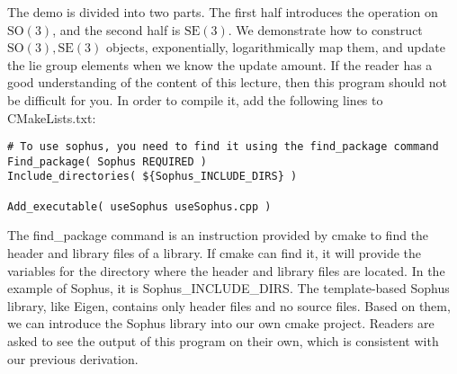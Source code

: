 The demo is divided into two parts. The first half introduces the operation on $\mathrm{SO}(3)$, and the second half is $\mathrm{SE}(3)$. We demonstrate how to construct $\mathrm{SO}(3), \mathrm{SE}(3)$ objects, exponentially, logarithmically map them, and update the lie group elements when we know the update amount. If the reader has a good understanding of the content of this lecture, then this program should not be difficult for you. In order to compile it, add the following lines to CMakeLists.txt:

\begin{lstlisting}[caption=slambook/ch4/useSophus/CMakeLists.txt]
# To use sophus, you need to find it using the find_package command
Find_package( Sophus REQUIRED )
Include_directories( ${Sophus_INCLUDE_DIRS} )

Add_executable( useSophus useSophus.cpp )
\end{lstlisting}

The find\_package command is an instruction provided by cmake to find the header and library files of a library. If cmake can find it, it will provide the variables for the directory where the header and library files are located. In the example of Sophus, it is Sophus\_INCLUDE\_DIRS. The template-based Sophus library, like Eigen, contains only header files and no source files. Based on them, we can introduce the Sophus library into our own cmake project. Readers are asked to see the output of this program on their own, which is consistent with our previous derivation.
